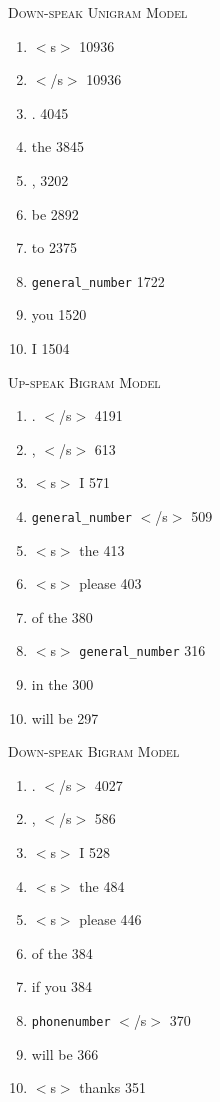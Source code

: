 \documentclass{article} %
\begin{document}
\textsc{Down-speak Unigram Model}\\
\begin{enumerate}
\item $<$s$>$ 10936
\item $<$/s$>$ 10936
\item . 4045
\item the 3845
\item , 3202
\item be 2892
\item to 2375
\item \texttt{general\_number} 1722
\item you 1520
\item I 1504
\end{enumerate}

\textsc{Up-speak Bigram Model}\\
\begin{enumerate}
\item . $<$/s$>$ 4191
\item , $<$/s$>$ 613
\item $<$s$>$  I 571
\item \texttt{general\_number} $<$/s$>$ 509
\item $<$s$>$  the 413
\item $<$s$>$  please 403
\item of the 380
\item $<$s$>$ \texttt{general\_number} 316
\item in the 300
\item will be 297
\end{enumerate}

\textsc{Down-speak Bigram Model}\\
\begin{enumerate}
\item . $<$/s$>$ 4027
\item , $<$/s$>$ 586
\item $<$s$>$ I 528
\item $<$s$>$ the 484
\item $<$s$>$ please 446
\item of the 384
\item if you 384
\item \texttt{phonenumber} $<$/s$>$ 370
\item will be 366
\item $<$s$>$  thanks 351
\end{enumerate}
\end{document}
